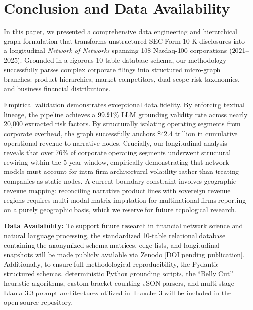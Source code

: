 \section{Conclusion and Data Availability}
\label{sec:conclusion}

In this paper, we presented a comprehensive data engineering and hierarchical graph formulation that transforms unstructured SEC Form 10-K disclosures into a longitudinal \textit{Network of Networks} spanning 108 Nasdaq-100 corporations (2021--2025). Grounded in a rigorous 10-table database schema, our methodology successfully parses complex corporate filings into structured micro-graph branches: product hierarchies, market competitors, dual-scope risk taxonomies, and business financial distributions.

Empirical validation demonstrates exceptional data fidelity. By enforcing textual lineage, the pipeline achieves a 99.91\% LLM grounding validity rate across nearly 20,000 extracted risk factors. By structurally isolating operating segments from corporate overhead, the graph successfully anchors \$42.4 trillion in cumulative operational revenue to narrative nodes. Crucially, our longitudinal analysis reveals that over 76\% of corporate operating segments underwent structural rewiring within the 5-year window, empirically demonstrating that network models must account for intra-firm architectural volatility rather than treating companies as static nodes. A current boundary constraint involves geographic revenue mapping: reconciling narrative product lines with sovereign revenue regions requires multi-modal matrix imputation for multinational firms reporting on a purely geographic basis, which we reserve for future topological research.

\vspace{1em}
\noindent\textbf{Data Availability:} To support future research in financial network science and natural language processing, the standardized 10-table relational database containing the anonymized schema matrices, edge lists, and longitudinal snapshots will be made publicly available via Zenodo [DOI pending publication]. Additionally, to ensure full methodological reproducibility, the Pydantic structured schemas, deterministic Python grounding scripts, the ``Belly Cut'' heuristic algorithms, custom bracket-counting JSON parsers, and multi-stage Llama 3.3 prompt architectures utilized in Tranche 3 will be included in the open-source repository.

